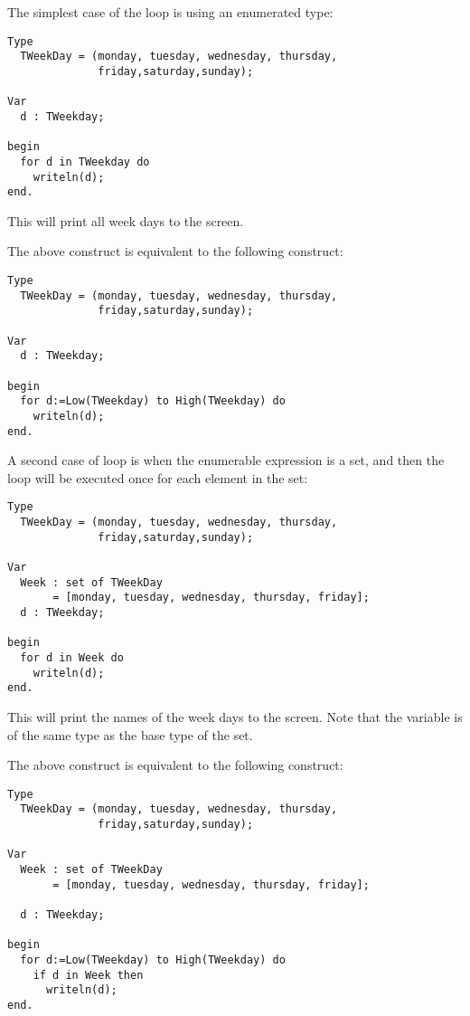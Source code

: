 The simplest case of the  loop is using an enumerated type:
\begin{verbatim}
Type
  TWeekDay = (monday, tuesday, wednesday, thursday,
              friday,saturday,sunday);

Var
  d : TWeekday;

begin
  for d in TWeekday do
    writeln(d);
end.
\end{verbatim}
This will print all week days to the screen.

The above  construct is equivalent to the following
 construct:
\begin{verbatim}
Type
  TWeekDay = (monday, tuesday, wednesday, thursday,
              friday,saturday,sunday);

Var
  d : TWeekday;

begin
  for d:=Low(TWeekday) to High(TWeekday) do
    writeln(d);
end.
\end{verbatim}

A second case of  loop is when the enumerable expression is a set,
and then the loop will be executed once for each element in the set:
\begin{verbatim}
Type
  TWeekDay = (monday, tuesday, wednesday, thursday,
              friday,saturday,sunday);
                
Var
  Week : set of TWeekDay 
       = [monday, tuesday, wednesday, thursday, friday];
  d : TWeekday;
                 
begin
  for d in Week do
    writeln(d);
end.
\end{verbatim}
This will print the names of the week days to the screen. Note that the
variable  is of the same type as the base type of the set.

The above  construct is equivalent to the following
 construct:
\begin{verbatim}
Type
  TWeekDay = (monday, tuesday, wednesday, thursday,
              friday,saturday,sunday);
   
Var
  Week : set of TWeekDay 
       = [monday, tuesday, wednesday, thursday, friday];

  d : TWeekday;

begin
  for d:=Low(TWeekday) to High(TWeekday) do
    if d in Week then
      writeln(d);
end.
\end{verbatim}

